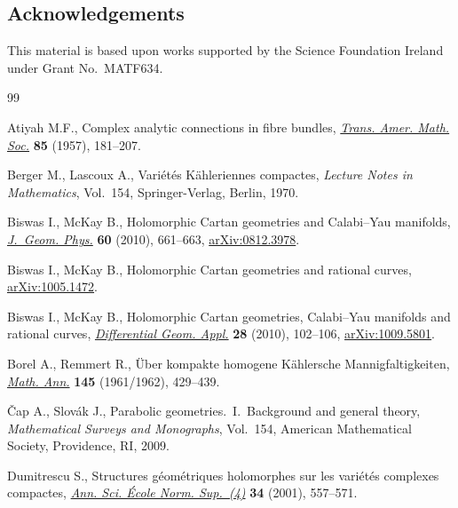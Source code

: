 \documentclass[pdftex]{sigma}
\begin{document}
\subsection*{Acknowledgements}
This material is based upon works supported by the Science Foundation
Ireland under Grant No.~MATF634.


\begin{thebibliography}{99}

\footnotesize\itemsep=0pt

 Atiyah M.F.,
Complex analytic connections in f\/ibre bundles,
\href{http://dx.doi.org/10.2307/1992969}{{\em Trans. Amer. Math. Soc.}} {\bf 85} (1957), 181--207.

  Berger M., Lascoux A.,
Vari\'et\'es K\"ahleriennes compactes,
{\it Lecture Notes in Mathematics}, Vol.~154, Springer-Verlag, Berlin, 1970.

 Biswas I.,  McKay B.,
 Holomorphic Cartan geometries and Calabi--Yau manifolds,
\href{http://dx.doi.org/10.1016/j.geomphys.2009.12.011}{{\em J.~Geom. Phys.}} {\bf 60} (2010), 661--663,
\href{http://arxiv.org/abs/0812.3978}{arXiv:0812.3978}.

Biswas I.,  McKay B.,
Holomorphic Cartan geometries and rational curves,
\href{http://arxiv.org/abs/1005.1472}{arXiv:1005.1472}.

Biswas I.,  McKay B.,
Holomorphic Cartan geometries, Calabi--Yau manifolds and rational curves,
\href{http://dx.doi.org/10.1016/j.difgeo.2009.09.003}{{\em Differential Geom. Appl.}} {\bf 28} (2010), 102--106,
\href{http://arxiv.org/abs/1009.5801}{arXiv:1009.5801}.

Borel A., Remmert R.,
\"{U}ber kompakte homogene K\"ahlersche Mannigfaltigkeiten,
\href{http://dx.doi.org/10.1007/BF01471087}{{\em Math. Ann.}} {\bf 145}  (1961/1962), 429--439.

\v{C}ap A., Slov{\'a}k J.,
Parabolic geometries.~I.~Background and general theory,
{\em Mathematical Surveys and Monographs}, Vol.~154,
American Mathematical Society, Providence, RI, 2009.


Dumitrescu S.,
Structures g\'eom\'etriques holomorphes sur les vari\'et\'es   complexes compactes,
\href{http://dx.doi.org/10.1016/S0012-9593(01)01070-9}{{\em Ann. Sci. \'Ecole Norm. Sup.~(4)}} {\bf 34} (2001), 557--571.


\end{thebibliography}
\end{document}
